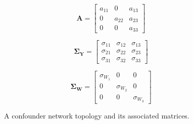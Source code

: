 \documentclass{article}
\begin{document}
\begin{figure}[H]
\centering

\def\figscale{1}

\begin{minipage}[c]{0.23\textwidth}
\centering

\def\a{1.2 cm}
\def\nodeSize{0.7}
\def\selfLoopR{0.5*\nodeSize cm}


\end{minipage}%
\hspace{0\textwidth}%
\begin{minipage}[c]{0.23\textwidth}
\raggedright

\[
\mathbf{A}=
\begin{bmatrix}
a_{11} & 0 & a_{13} \\
0 & a_{22} & a_{23} \\
0 & 0 & a_{33}
\end{bmatrix}
\]

\end{minipage}%
\hspace{0.005\textwidth}%
\begin{minipage}[c]{0.25\textwidth}
\raggedright

\[
\mathbf{\Sigma_Y}=
\begin{bmatrix}
\sigma_{11} & \sigma_{12} & \sigma_{13} \\
\sigma_{21} & \sigma_{22} & \sigma_{23} \\
\sigma_{31} & \sigma_{32} & \sigma_{33}
\end{bmatrix}
\]

\end{minipage}%
\hspace{0.005\textwidth}%
\begin{minipage}[c]{0.27\textwidth}
\raggedright

\[
\mathbf{\Sigma_W}=
\begin{bmatrix}
\sigma_{W_1} & 0 & 0 \\
0 & \sigma_{W_2} & 0 \\
0 & 0 & \sigma_{W_3}
\end{bmatrix}
\]

\end{minipage}%

\caption{A confounder network topology and its associated matrices.}
\label{fig:network3by3_confounder}
\end{figure}
\end{document}
